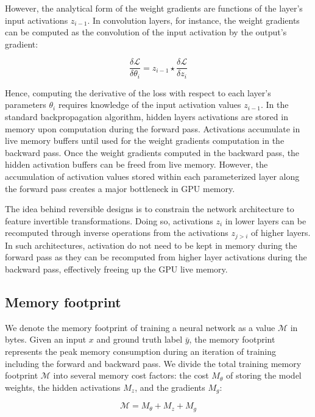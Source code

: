 \documentclass[twocolumn]{bmcart}
\begin{document}
However, the analytical form of the weight gradients are functions of the layer's input activations $z_{i-1}$.
In convolution layers, for instance, the weight gradients can be computed as the convolution of the input activation by the output's gradient:

 \begin{equation}
\frac{\delta \mathcal{L}}{\delta \theta_i} = z_{i-1} \star \frac{\delta \mathcal{L}}{\delta z_i}
 \end{equation}

Hence, computing the derivative of the loss with respect to each layer's parameters $\theta_i$ requires knowledge of the input activation values $z_{i-1}$.
In the standard backpropagation algorithm, hidden layers activations are stored in memory upon computation during the forward pass.
Activations accumulate in live memory buffers until used for the weight gradients computation in the backward pass.
Once the weight gradients computed in the backward pass, the hidden activation buffers can be freed from live memory.
However, the accumulation of activation values stored within each parameterized layer along the forward pass creates a major bottleneck in GPU memory.

The idea behind reversible designs is to constrain the network architecture to feature invertible transformations.
Doing so, activations $z_i$ in lower layers can be recomputed through inverse operations from the activations $z_{j>i}$ of higher layers.
In such architectures, activation do not need to be kept in memory during the forward pass as they can be recomputed from higher layer activations during the backward pass, effectively freeing up the GPU live memory.

\subsection{Memory footprint}

We denote the memory footprint of training a neural network as a value $\mathcal{M}$ in bytes.
Given an input $x$ and ground truth label $\bar{y}$, the memory footprint represents the peak memory consumption during an iteration of training including the forward and backward pass.
We divide the total training memory footprint $\mathcal{M}$ into several memory cost factors: the cost $M_{\theta}$ of storing the model weights, the hidden activations  $M_{z}$, and the gradients $M_{g}$:

\begin{equation}
\mathcal{M} = M_{\theta} + M_{z} + M_{g}
\end{equation}
\end{document}

